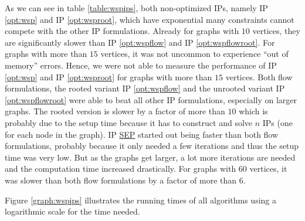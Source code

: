 As we can see in table \ref{table:wspips}, both non-optimized IPs, namely IP \ref{opt:wsp} and IP \ref{opt:wsproot}, which have exponential many constraints cannot compete with the other IP formulations. Already for graphs with $10$ vertices, they are significantly slower than IP \ref{opt:wspflow} and IP \ref{opt:wspflowroot}. For graphs with more than $15$ vertices, it was not uncommon to experience ``out of memory'' errors. Hence, we were not able to measure the performance of IP \ref{opt:wsp} and IP \ref{opt:wsproot} for graphs with more than $15$ vertices. Both flow formulations, the rooted variant IP \ref{opt:wspflow} and the unrooted variant IP \ref{opt:wspflowroot} were able to beat all other IP formulations, especially on larger graphs. The rooted version is slower by a factor of more than $10$ which is probably due to the setup time because it has to construct and solve $n$ IPs (one for each node in the graph). IP \href{sec:integer:seperation}{SEP} started out being faster than both flow formulations, probably because it only needed a few iterations and thus the setup time was very low. But as the graphs get larger, a lot more iterations are needed and the computation time increased drastically. For graphs with $60$ vertices, it was slower than both flow formulations by a factor of more than $6$.\medskip

Figure \ref{graph:wspips} illustrates the running times of all algorithms using a logarithmic scale for the time needed.

